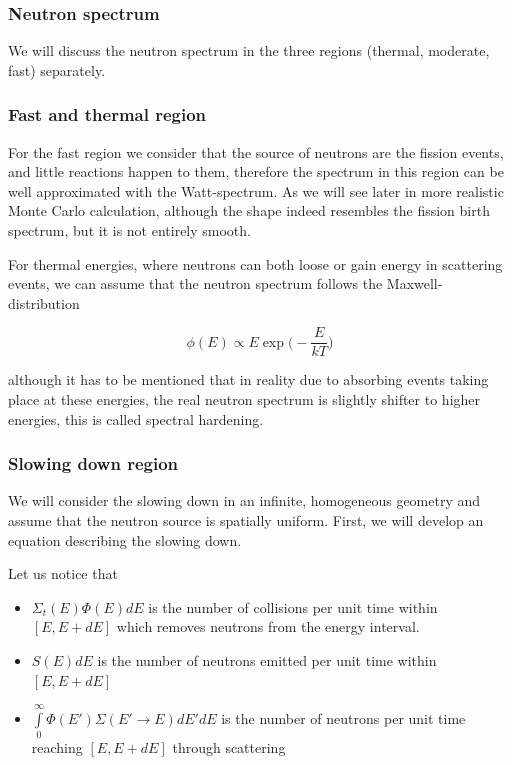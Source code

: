 \subsubsection{Neutron spectrum}

We will discuss the neutron spectrum in the three regions (thermal, moderate, fast) separately.

\subsubsection*{Fast and thermal region}

For the fast region we consider that the source of neutrons are the fission events, and little reactions happen to them, therefore the spectrum in this region can be well approximated with the Watt-spectrum. As we will see later in more realistic Monte Carlo calculation, although the shape indeed resembles the fission birth spectrum, but it is not entirely smooth.

For thermal energies, where neutrons can both loose or gain energy in scattering events, we can assume that the neutron spectrum follows the Maxwell-distribution

$$\phi(E)\propto E\exp\big(-\frac{E}{kT}\big)$$

\noindent although it has to be mentioned that in reality due to absorbing events taking place at these energies, the real neutron spectrum is slightly shifter to higher energies, this is called spectral hardening.

\subsubsection*{Slowing down region}

We will consider the slowing down in an infinite, homogeneous geometry and assume that the neutron source is spatially uniform. First, we will develop an equation describing the slowing down.

Let us notice that 

\begin{itemize}
\item $\Sigma_t(E)\Phi(E)dE$ is the number of collisions per unit time within $[E,E+dE]$ which removes neutrons from the energy interval.
\item $S(E)dE$ is the number of neutrons emitted per unit time within $[E,E+dE]$
\item $\int\limits_0^\infty \Phi(E')\Sigma(E'\rightarrow E)dE'dE$ is the number of neutrons per unit time reaching $[E,E+dE]$ through scattering
\end{itemize}

